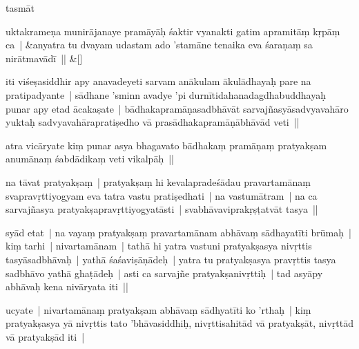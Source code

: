 \documentclass[article,12pt,a4paper]{memoir}%
\newcounter{parCount}
\begin{document}
	  
	  \pstart \leavevmode%
	tasmāt 
	{}
	\pend%
      
	    
	    \stanza[\smallbreak]
	  uktakrameṇa munirājanaye pramāyāḥ śaktir vyanakti gatim apramitāṃ kṛpāṃ ca | &anyatra tu dvayam udastam ado 'stamāne tenaika eva śaraṇaṃ sa nirātmavādī || \&[\smallbreak]
	  
	  
	  

	  
	  \pstart \leavevmode%
	iti viśeṣasiddhir apy anavadeyeti sarvam anākulam ākulādhayaḥ pare na pratipadyante | sādhane 'sminn avadye 'pi durnītidahanadagdhabuddhayaḥ punar apy etad ācakaṣate | bādhakapramāṇasadbhāvāt sarvajñasyāsadvyavahāro yuktaḥ sadvyavahārapratiṣedho vā prasādhakapramāṇābhāvād veti || 
	{}
	\pend%
      

	  
	  \pstart \leavevmode%
	\label{thakur75-6.25}atra vicāryate kiṃ punar asya bhagavato bādhakaṃ pramāṇaṃ pratyakṣam anumānaṃ śabdādikaṃ veti vikalpāḥ || 
	{}
	\pend%
      

	  
	  \pstart \leavevmode%
	\label{thakur75-6.27}na tāvat pratyakṣaṃ | pratyakṣaṃ hi kevalapradeśādau pravartamānaṃ svapravṛttiyogyam eva tatra vastu pratiṣedhati | na vastumātram | na ca sarvajñasya pratyakṣapravṛttiyogyatāsti | svabhāvaviprakṛṣṭatvāt tasya || 
	{}
	\pend%
      

	  
	  \pstart \leavevmode%
	\label{thakur75-7.1}syād etat | na vayaṃ pratyakṣaṃ pravartamānam abhāvaṃ sādhayatīti brūmaḥ | kiṃ tarhi | nivartamānam | tathā hi yatra vastuni pratyakṣasya nivṛttis tasyāsadbhāvaḥ | yathā śaśaviṣāṇādeḥ | yatra tu pratyakṣasya pravṛttis tasya sadbhāvo yathā ghaṭādeḥ | asti ca sarvajñe pratyakṣanivṛttiḥ | tad asyāpy abhāvaḥ kena nivāryata iti || 
	{}
	\pend%
      

	  
	  \pstart \leavevmode%
	\label{thakur75-7.5}ucyate | nivartamānaṃ pratyakṣam abhāvaṃ sādhyatīti ko 'rthaḥ | kiṃ pratyakṣasya yā nivṛttis tato 'bhāvasiddhiḥ, nivṛttisahitād vā pratyakṣāt, nivṛttād vā pratyakṣād iti | 
	{}
	\pend%
      
\end{document}

